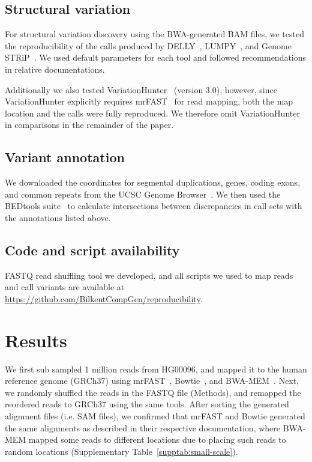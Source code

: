 \documentclass[10pt,a4paper]{article}
\begin{document}
\subsection{Structural variation}

For structural variation discovery using the BWA-generated BAM files, we tested the reproducibility of the calls produced by DELLY~\cite{Rausch2012}, LUMPY~\cite{Layer2014}, and Genome STRiP~\cite{Handsaker2011,Handsaker2015}. 
We used default parameters for each tool and followed recommendations in relative documentations.

Additionally we also tested VariationHunter~\cite{Hormozdiari2009,Hormozdiari2010} (version 3.0), however, since VariationHunter explicitly requires mrFAST~\cite{Alkan2009,Xin2013} for read mapping, 
both the map location and the calls were fully reproduced. We therefore omit VariationHunter in comparisons in the remainder of the paper.

\subsection{Variant annotation}

We downloaded the coordinates for segmental duplications, genes, coding exons, and common repeats from the UCSC Genome Browser~\cite{Kent2002}. 
We then used the BEDtools suite~\cite{Quinlan2010a} to calculate intersections between discrepancies in call sets with the annotations listed above.

\subsection{Code and script availability} FASTQ read shuffling tool we developed, and all scripts we used to map reads and call variants are available at 
\url{https://github.com/BilkentCompGen/reproducibility}.

\section{Results}
We first sub sampled 1 million reads from HG00096, and mapped it to the human reference genome (GRCh37) using mrFAST~\cite{Alkan2009,Xin2013}, Bowtie~\cite{Langmead2009}, and BWA-MEM~\cite{Li2009a,Li2013}.
Next, we randomly shuffled the reads in the FASTQ file (Methods), and remapped the reordered reads to GRCh37 using the same tools.
After sorting the generated alignment files (i.e. SAM files), we confirmed that mrFAST and Bowtie generated the same alignments as described in their respective documentation, 
where BWA-MEM mapped some reads to different locations due to placing 
such reads to random locations (Supplementary Table~\ref{supptab:small-scale}).
\end{document}

